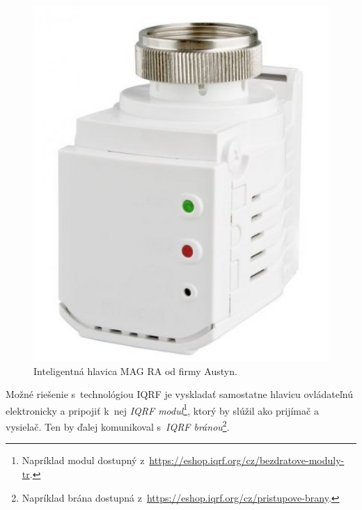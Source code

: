 \begin{figure}[H]
    \centering
    \includegraphics[scale=0.4]{obrazky-figures/m_retusovana-hlavica.jpg}
    \caption{Inteligentná hlavica MAG RA od firmy Austyn.}
    \label{fig:IQRF-TRV}
\end{figure}


Možné riešenie s~technológiou IQRF je vyskladať samostatne hlavicu ovládateľnú elektronicky a pripojiť k~nej \emph{IQRF modul}\footnote{Napríklad modul dostupný z~\url{https://eshop.iqrf.org/cz/bezdratove-moduly-tr}.}, ktorý by slúžil ako prijímač a vysielač. 
Ten by ďalej komunikoval s~\emph{IQRF bránou}\footnote{Napríklad brána dostupná z~\url{https://eshop.iqrf.org/cz/pristupove-brany}.}.  
